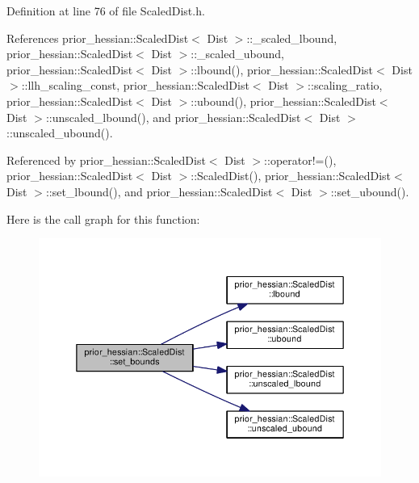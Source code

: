 Definition at line 76 of file Scaled\+Dist.\+h.



References prior\+\_\+hessian\+::\+Scaled\+Dist$<$ Dist $>$\+::\+\_\+scaled\+\_\+lbound, prior\+\_\+hessian\+::\+Scaled\+Dist$<$ Dist $>$\+::\+\_\+scaled\+\_\+ubound, prior\+\_\+hessian\+::\+Scaled\+Dist$<$ Dist $>$\+::lbound(), prior\+\_\+hessian\+::\+Scaled\+Dist$<$ Dist $>$\+::llh\+\_\+scaling\+\_\+const, prior\+\_\+hessian\+::\+Scaled\+Dist$<$ Dist $>$\+::scaling\+\_\+ratio, prior\+\_\+hessian\+::\+Scaled\+Dist$<$ Dist $>$\+::ubound(), prior\+\_\+hessian\+::\+Scaled\+Dist$<$ Dist $>$\+::unscaled\+\_\+lbound(), and prior\+\_\+hessian\+::\+Scaled\+Dist$<$ Dist $>$\+::unscaled\+\_\+ubound().



Referenced by prior\+\_\+hessian\+::\+Scaled\+Dist$<$ Dist $>$\+::operator!=(), prior\+\_\+hessian\+::\+Scaled\+Dist$<$ Dist $>$\+::\+Scaled\+Dist(), prior\+\_\+hessian\+::\+Scaled\+Dist$<$ Dist $>$\+::set\+\_\+lbound(), and prior\+\_\+hessian\+::\+Scaled\+Dist$<$ Dist $>$\+::set\+\_\+ubound().



Here is the call graph for this function\+:\nopagebreak
\begin{figure}[H]
\begin{center}
\leavevmode
\includegraphics[width=350pt]{classprior__hessian_1_1ScaledDist_a07e9dea370e56001f76ed8e10693f399_cgraph}
\end{center}
\end{figure}





